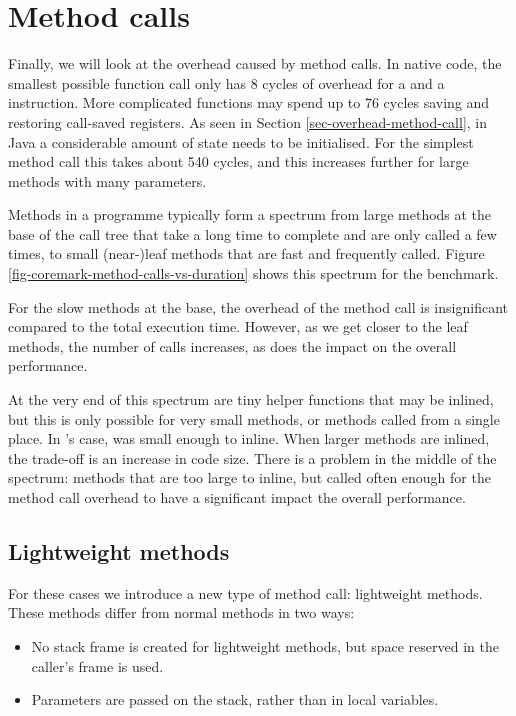 \section{Method calls}
\label{sec-optimisations-method-calls}

Finally, we will look at the overhead caused by method calls. In native code, the smallest possible function call only has 8 cycles of overhead for a  and a  instruction. More complicated functions may spend up to 76 cycles saving and restoring call-saved registers. As seen in Section \ref{sec-overhead-method-call}, in Java a considerable amount of state needs to be initialised. For the simplest method call this takes about 540 cycles, and this increases further for large methods with many parameters.

Methods in a programme typically form a spectrum from large methods at the base of the call tree that take a long time to complete and are only called a few times, to small (near-)leaf methods that are fast and frequently called. Figure \ref{fig-coremark-method-calls-vs-duration} shows this spectrum for the  benchmark.

For the slow methods at the base, the overhead of the method call is insignificant compared to the total execution time. However, as we get closer to the leaf methods, the number of calls increases, as does the impact on the overall performance.

At the very end of this spectrum are tiny helper functions that may be inlined, but this is only possible for very small methods, or methods called from a single place. In 's case,  was small enough to inline. When larger methods are inlined, the trade-off is an increase in code size. There is a problem in the middle of the spectrum: methods that are too large to inline, but called often enough for the method call overhead to have a significant impact the overall performance.

\subsection{Lightweight methods}
For these cases we introduce a new type of method call: lightweight methods. These methods differ from normal methods in two ways:
\begin{itemize}
	\item No stack frame is created for lightweight methods, but space reserved in the caller's frame is used.
	\item Parameters are passed on the stack, rather than in local variables.
\end{itemize}

